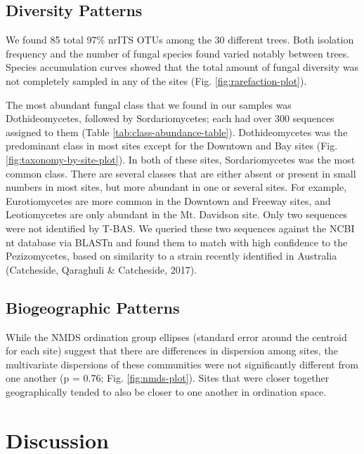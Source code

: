 \documentclass[fleqn,10pt,lineno]{wlpeerj} %
\begin{document}
\hypertarget{diversity-patterns}{%
\subsection*{Diversity Patterns}\label{diversity-patterns}}

We found 85 total 97\% nrITS OTUs among the 30 different trees. Both isolation frequency and the number of fungal species found varied notably between trees. Species accumulation curves showed that the total amount of fungal diversity was not completely sampled in any of the sites (Fig. \ref{fig:rarefaction-plot}).

The most abundant fungal class that we found in our samples was Dothideomycetes, followed by Sordariomycetes; each had over 300 sequences assigned to them (Table \ref{tab:class-abundance-table}). Dothideomycetes was the predominant class in most sites except for the Downtown and Bay sites (Fig. \ref{fig:taxonomy-by-site-plot}). In both of these sites, Sordariomycetes was the most common class. There are several classes that are either absent or present in small numbers in most sites, but more abundant in one or several sites. For example, Eurotiomycetes are more common in the Downtown and Freeway sites, and Leotiomycetes are only abundant in the Mt. Davidson site. Only two sequences were not identified by T-BAS. We queried these two sequences against the NCBI nt database via BLASTn and found them to match with high confidence to the Pezizomycetes, based on similarity to a strain recently identified in Australia (Catcheside, Qaraghuli \& Catcheside, 2017).

\hypertarget{biogeographic-patterns}{%
\subsection*{Biogeographic Patterns}\label{biogeographic-patterns}}

While the NMDS ordination group ellipses (standard error around the centroid for each site) suggest that there are differences in dispersion among sites, the multivariate dispersions of these communities were not significantly different from one another (p = 0.76; Fig. \ref{fig:nmds-plot}). Sites that were closer together geographically tended to also be closer to one another in ordination space.

\hypertarget{discussion}{%
\section*{Discussion}\label{discussion}}
\end{document}
